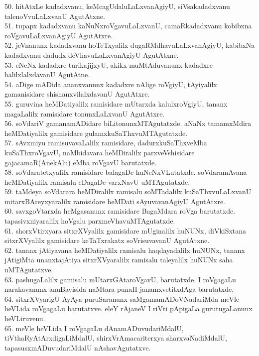 \documentclass{article}
\begin{document}
50. hitAtxLe kadadxvanu, keMcagUdaluLaLxvanAgiyU, siVsakadadxvanu talenoVvuLaLxvanU AgutAtxne.\\
51. tupapx kadadxvanu kaNuNxroVgavuLaLxvanU, camaRkadadxvanu kobibxna roVgavuLaLxvanAgiyU AgutAtxre.\\
52. jeVnanunx kadadxvanu hoTeTxyalilx dugaRMdhavuLaLxvanAgiyU, kabibxNa kadadxvanu dadudx deVhavuLaLxvanAgiyU AgutAtxne.\\
53. eNeNx kadadxre turikajijxyU, akikx muMtAduvanunx kadadxre halilxlalxdavanU AgutAtne.\\
54. aDige mADida ananxvanunx kadadxre nAlige roVgiyU, tAyiyalilx gamanisidare shishanxvilalxdavanU AgutAtxre.\\
55. guruvina heMDatiyalilx ramisidare mUtarxda kalulxroVgiyU, tananx magaLalilx ramisidare tonunxLaLxvanU AgutAtxre.\\
56. soVdariV gamanamADidare biLitonunxMTAgutatxde. aNaNx tamamxMdira heMDatiyalilx gamisidare gulamxkuSaThxvuMTAgutatxde.\\
57. sAvxmiyu ramisuvavaLalilx ramisidare, dadurxkuSaThxveMba kuSaThxroVgavU, naMbidavara heMDiralilx parxveVshisidare gajacamaR(AnekAlu) eMba roVgavU barutatxde.\\
58. soVdaratetxyalilx ramisidare balagaDe huNeNxVLutatxde. soVdaramAvana heMDatiyalilx ramisalu eDagaDe varxNavU uMTAgutatxde.\\
59. taMdeya soVdarara heMDiralilx ramisalu soMTadalilx kuSaThxvuLaLxvanU mitarxBAreyxyaralilx ramisidare heMDati sAyuvavanAgiyU AgutAtxre.\\
60. savxgoVtarxda heMgasanunx ramisidare BagaMdara roVga barutatxde. tapasivxniyaralilx hoVgalu parxmeVhavuMTAgutatxde.\\
61. shorxVtirxyara sitxrXVyalilx gamisidare mUginalilx huNUNx, diVkiSxtana sitxrXVyalilx gamisidare keTaTxrakatx soVrisuvavanU AgutAtxne.\\
62. tananx jAtiyavana heMDatiyalilx ramisalu haqdayadalilx huNUNx, tananx jAtigiMta unanxtajAtiya sitxrXVyaralilx ramisalu taleyalilx huNUNx saha uMTAgutatxve.\\
63. pashugaLalilx gamisalu mUtarxGAtaroVgavU, barutatxde. I roVgagaLu narakavanunx anuBavisida naMtara punaH janamxvetitxdAga barutatxde.\\
64. sitxrXVyarigU AyAya puruSaranunx saMgamamADoVNadariMda meVle heVLida roVgagaLu barutatxve. eleY rAjaneV I riVti pApigaLa gurutugaLanunx heVLiruvenu.\\
65. meVle heVLida I roVgagaLu dAnamADuvudariMdalU, tiVthaRyAtArxdigaLiMdalU, shirxVrAmacariterxya sharxvaNadiMdalU, tapasusxmADuvudariMdalU nAshavAgutatxve.\\
\end{document}
